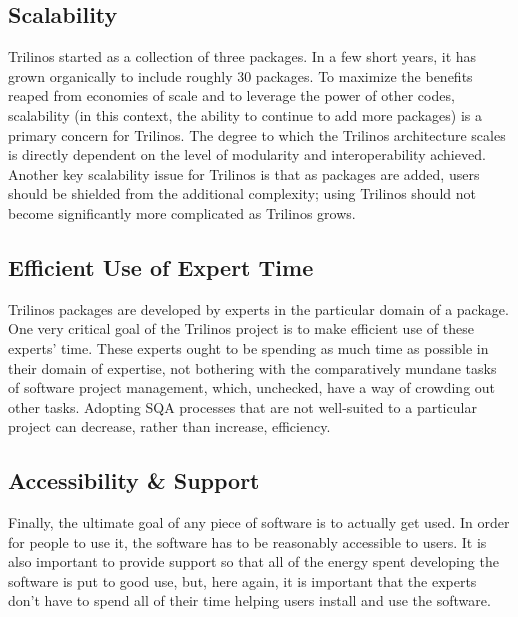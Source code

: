 \documentclass[12pt,relax]{article}
\begin{document}
\subsection{Scalability}
Trilinos started as a collection of three packages.  In a few short years, it
has grown organically to include roughly 30 packages.  To maximize the
benefits reaped from economies of scale and to leverage the power of other
codes, scalability (in this context, the ability to continue to add more
packages) is a primary concern for Trilinos.  The degree to which the Trilinos
architecture scales is directly dependent on the level of modularity and
interoperability achieved.  Another key scalability issue for Trilinos is that
as packages are added, users should be shielded from the additional complexity;
using Trilinos should not become significantly more complicated as Trilinos
grows.

\subsection{Efficient Use of Expert Time}
Trilinos packages are developed by experts in the particular domain of a
package.  One very critical goal of the Trilinos project is to make efficient
use of these experts' time.  These experts ought to be spending as much time as
possible in their domain of expertise, not bothering with the comparatively
mundane tasks of software project management, which, unchecked, have a way of
crowding out other tasks.  Adopting SQA processes that are not well-suited to a
particular project can decrease, rather than increase, efficiency.

\subsection{Accessibility \& Support}
Finally, the ultimate goal of any piece of software is to actually get used.  
In order for people to use it, the software has to be reasonably accessible to
users.  It is also important to provide support so that all of the energy spent
developing the software is put to good use, but, here again, it is important
that the experts don't have to spend all of their time helping users install
and use the software.

\clearpage

\end{document}
